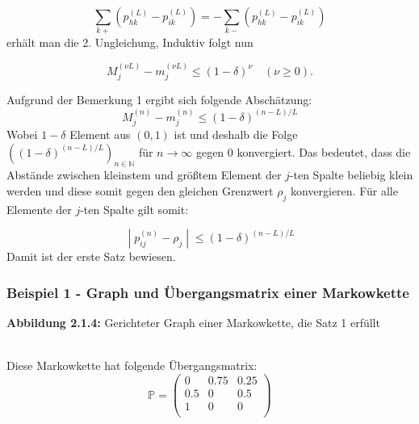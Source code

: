 \documentclass[a4paper]{article}
\begin{document}
\[
\sum_{k+} \left(
	p_{hk} ^{(L)} - p_{ik} ^{(L)}
\right) 
=
-
\sum_{k-} \left(
	p_{hk} ^{(L)} - p_{ik} ^{(L)}
\right) 
\] 
erhält man die 2. Ungleichung,
Induktiv folgt nun

\[
M_j ^{(\nu L)} - m_j ^{(\nu L)}
\leq \left(
	1 - \delta
\right) ^{\nu} \quad (\nu \geq 0) .
\] 

Aufgrund der Bemerkung 1 ergibt sich folgende Abschätzung:
\[
	M_j ^{(n)} - m_j ^{(n)} \leq \left(
		1 - \delta
	\right) ^{(n-L) / L}
\]
Wobei $1- \delta$ Element aus $(0,1)$ ist und deshalb die Folge 
$\left(
	(1 - \delta) ^{(n-L) / L}
\right) _{n \in \mathbb{N}} $
für $n \rightarrow \infty$ gegen $0$
konvergiert. Das bedeutet, dass die Abstände zwischen kleinstem und größtem Element der $j$-ten
Spalte beliebig klein werden und diese somit gegen den gleichen Grenzwert $\rho_j$ konvergieren. Für
alle Elemente der $j$-ten Spalte gilt somit:

\[
	\; | \; p_{ij} ^{(n)} - \rho_j \; | \; \leq (1 - \delta) ^{(n-L) / L}
\]
Damit ist der erste Satz bewiesen.

\subsubsection{Beispiel 1 - Graph und Übergangsmatrix einer Markowkette}

\begin{center}
\end{center}
\qquad \caption{\textbf{Abbildung 2.1.4:} Gerichteter Graph einer Markowkette, die Satz 1 erfüllt}
\\

Diese Markowkette hat folgende Übergangsmatrix:
\[
	\mathbb{P} = \begin{pmatrix} 
		0 & 0.75 & 0.25 \\
		0.5 & 0 & 0.5 \\
		1 & 0 & 0 \\
	\end{pmatrix} 
\]
\end{document}
